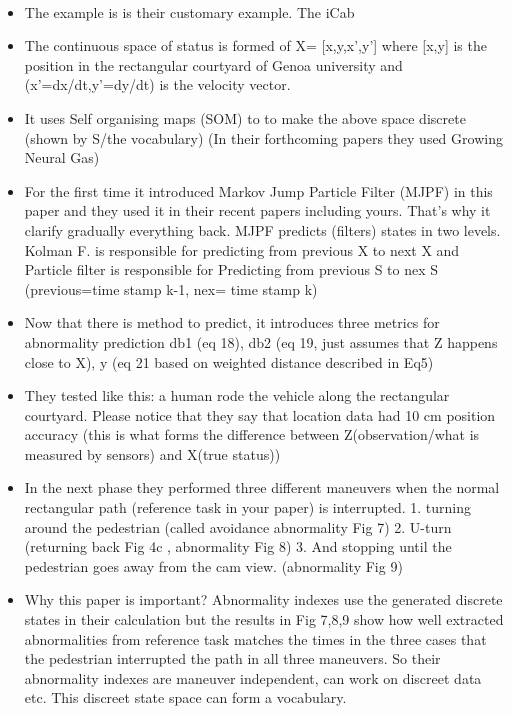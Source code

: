\documentclass{article}
\begin{document}
				\paragraph{\cite{baydoun-2018-learning-switching-models-for-abnormality-detection-for-autonomous-driving}}
					\begin{itemize}
						\item The example is is their customary example. The iCab 
						\item The continuous space of status is formed of X= [x,y,x',y'] where [x,y] is the position in the rectangular courtyard of Genoa university and (x'=dx/dt,y'=dy/dt)  is the velocity vector.
						\item It uses Self organising maps (SOM) to to make the above space discrete (shown by S/the vocabulary) (In their forthcoming papers they used Growing Neural Gas)
						\item For the first time it introduced Markov Jump Particle Filter (MJPF) in this paper and they used it in their recent papers including yours. That's why it clarify gradually everything back. MJPF predicts (filters) states in two levels. Kolman F. is responsible for predicting from previous X to next X and Particle filter is responsible for Predicting from previous S to nex S (previous=time stamp k-1, nex= time stamp k) 
						\item Now that there is method to predict, it introduces three metrics for abnormality prediction db1 (eq 18), db2 (eq 19, just assumes that Z happens close to X), y (eq 21 based on weighted distance described in Eq5)
						\item They tested like this: a human rode the vehicle along the rectangular courtyard.  Please notice that they say that location data had 10 cm position accuracy (this is what forms the difference between Z(observation/what is measured by sensors) and X(true status))
						\item In the next phase they performed three different maneuvers when the normal rectangular path (reference task in your paper) is interrupted. 1. turning around the pedestrian (called avoidance abnormality Fig 7) 2. U-turn (returning back Fig 4c , abnormality Fig 8) 3. And stopping until the pedestrian goes away from the cam view. (abnormality Fig 9)
						\item Why this paper is important? Abnormality indexes use the generated discrete states in their calculation but the results in Fig 7,8,9 show how well extracted abnormalities from reference task matches the times in the three cases that the pedestrian interrupted the path in all three maneuvers.  So their abnormality indexes are maneuver independent, can work on discreet data etc. This discreet state space can form a vocabulary.
					\end{itemize}
\end{document}

